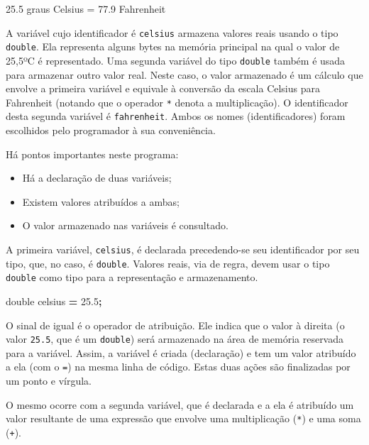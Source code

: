 \documentclass[
  11pt,
  a4paper,
]{scrbook}
\newenvironment{Shaded}{\begin{snugshade}}{\end{snugshade}}
\newcommand{\DataTypeTok}[1]{\textcolor[rgb]{0.13,0.29,0.53}{#1}}
\newcommand{\FloatTok}[1]{\textcolor[rgb]{0.00,0.00,0.81}{#1}}
\newcommand{\NormalTok}[1]{#1}
\newcommand{\OperatorTok}[1]{\textcolor[rgb]{0.81,0.36,0.00}{\textbf{#1}}}
\providecommand{\tightlist}{%
  \setlength{\itemsep}{0pt}\setlength{\parskip}{0pt}}\usepackage{longtable,booktabs,array}
\begin{document}
\begin{Shaded}
\begin{Highlighting}[]
\NormalTok{25.5 graus Celsius = 77.9 Fahrenheit}
\end{Highlighting}
\end{Shaded}

A variável cujo identificador é \texttt{celsius} armazena valores reais
usando o tipo \texttt{double}. Ela representa alguns bytes na memória
principal na qual o valor de 25,5ºC é representado. Uma segunda variável
do tipo \texttt{double} também é usada para armazenar outro valor real.
Neste caso, o valor armazenado é um cálculo que envolve a primeira
variável e equivale à conversão da escala Celsius para Fahrenheit
(notando que o operador \texttt{*} denota a multiplicação). O
identificador desta segunda variável é \texttt{fahrenheit}. Ambos os
nomes (identificadores) foram escolhidos pelo programador à sua
conveniência.

Há pontos importantes neste programa:

\begin{itemize}
\tightlist
\item
  Há a declaração de duas variáveis;
\item
  Existem valores atribuídos a ambas;
\item
  O valor armazenado nas variáveis é consultado.
\end{itemize}

A primeira variável, \texttt{celsius}, é declarada precedendo-se seu
identificador por seu tipo, que, no caso, é \texttt{double}. Valores
reais, via de regra, devem usar o tipo \texttt{double} como tipo para a
representação e armazenamento.

\begin{Shaded}
\begin{Highlighting}[]
\DataTypeTok{double}\NormalTok{ celsius }\OperatorTok{=} \FloatTok{25.5}\OperatorTok{;} 
\end{Highlighting}
\end{Shaded}

O sinal de igual é o operador de atribuição. Ele indica que o valor à
direita (o valor \texttt{25.5}, que é um \texttt{double}) será
armazenado na área de memória reservada para a variável. Assim, a
variável é criada (declaração) e tem um valor atribuído a ela (com o
\texttt{=}) na mesma linha de código. Estas duas ações são finalizadas
por um ponto e vírgula.

O mesmo ocorre com a segunda variável, que é declarada e a ela é
atribuído um valor resultante de uma expressão que envolve uma
multiplicação (\texttt{*}) e uma soma (\texttt{+}).
\end{document}
